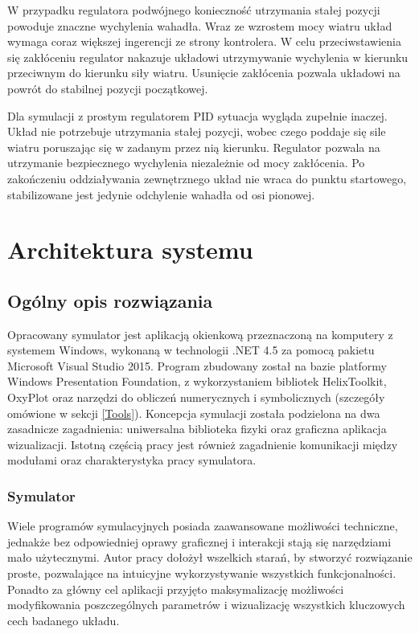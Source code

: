 \documentclass[12pt, oneside]{report}
\theoremstyle{definition}
\begin{document}
W przypadku regulatora podwójnego konieczność utrzymania stałej pozycji powoduje znaczne wychylenia wahadła. Wraz ze wzrostem mocy wiatru układ wymaga coraz większej ingerencji ze strony kontrolera. W celu przeciwstawienia się zakłóceniu regulator nakazuje układowi utrzymywanie wychylenia w kierunku przeciwnym do kierunku siły wiatru. Usunięcie zakłócenia pozwala układowi na powrót do stabilnej pozycji początkowej. 

Dla symulacji z prostym regulatorem PID sytuacja wygląda zupełnie inaczej. Układ nie potrzebuje utrzymania stałej pozycji, wobec czego poddaje się sile wiatru poruszając się w zadanym przez nią kierunku. Regulator pozwala na utrzymanie bezpiecznego wychylenia niezależnie od mocy zakłócenia. Po zakończeniu oddziaływania zewnętrznego układ nie wraca do punktu startowego, stabilizowane jest jedynie odchylenie wahadła od osi pionowej.


\chapter{Architektura systemu}
\section{Ogólny opis rozwiązania}
Opracowany symulator jest aplikacją okienkową przeznaczoną na komputery z systemem Windows, wykonaną w technologii .NET 4.5 za pomocą pakietu Microsoft Visual Studio 2015. Program zbudowany został na bazie platformy Windows Presentation Foundation, z wykorzystaniem bibliotek HelixToolkit, OxyPlot oraz narzędzi do obliczeń numerycznych i symbolicznych (szczegóły omówione w sekcji \ref{Tools}). Koncepcja symulacji została podzielona na dwa zasadnicze zagadnienia: uniwersalna biblioteka fizyki oraz graficzna aplikacja wizualizacji. Istotną częścią pracy jest również zagadnienie komunikacji między modułami oraz charakterystyka pracy symulatora.

\subsection{Symulator}
Wiele programów symulacyjnych posiada zaawansowane możliwości techniczne, jednakże bez odpowiedniej oprawy graficznej i interakcji stają się narzędziami mało użytecznymi. Autor pracy dołożył wszelkich starań, by stworzyć rozwiązanie proste, pozwalające na intuicyjne wykorzystywanie wszystkich funkcjonalności. Ponadto za główny cel aplikacji przyjęto maksymalizację możliwości modyfikowania poszczególnych parametrów i wizualizację wszystkich kluczowych cech badanego układu. 
\end{document}
